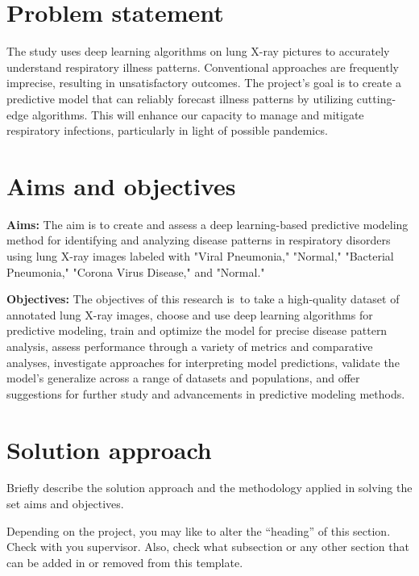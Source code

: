\section{Problem statement}
\label{sec:intro_prob_art}
The study uses deep learning algorithms on lung X-ray pictures to accurately understand respiratory illness patterns. Conventional approaches are frequently imprecise, resulting in unsatisfactory outcomes. The project's goal is to create a predictive model that can reliably forecast illness patterns by utilizing cutting-edge algorithms. This will enhance our capacity to manage and mitigate respiratory infections, particularly in light of possible pandemics.

\section{Aims and objectives}
\label{sec:intro_aims_obj}


\textbf{Aims:} The aim is to create and assess a deep learning-based predictive modeling method for identifying and analyzing disease patterns in respiratory disorders using lung X-ray images labeled with "Viral Pneumonia," "Normal," "Bacterial Pneumonia," "Corona Virus Disease," and "Normal."

\textbf{Objectives:} The objectives of this research is to take a high-quality dataset of annotated lung X-ray images, choose and use deep learning algorithms for predictive modeling, train and optimize the model for precise disease pattern analysis, assess performance through a variety of metrics and comparative analyses, investigate approaches for interpreting model predictions, validate the model's generalize across a range of datasets and populations, and offer suggestions for further study and advancements in predictive modeling methods.



\section{Solution approach}
\label{sec:intro_sol} %
Briefly describe the solution approach and the methodology applied in solving the set aims and objectives.

Depending on the project, you may like to alter the ``heading'' of this section. Check with you supervisor. Also, check what subsection or any other section that can be added in or removed from this template.

